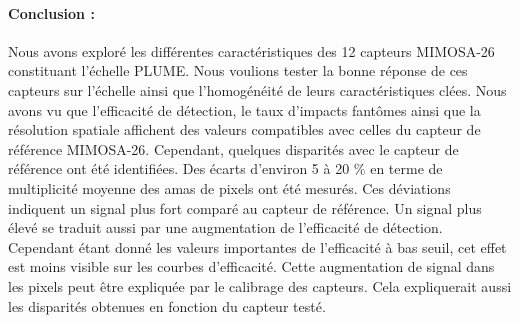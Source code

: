 %     
% 
   
  
  \paragraph{Conclusion :}
  
   Nous avons explor\'e les diff\'erentes caract\'eristiques des 12 capteurs MIMOSA-26 constituant l'\'echelle PLUME. Nous voulions tester la bonne r\'eponse de ces capteurs sur l'\'echelle ainsi que l'homog\'en\'eit\'e de leurs caract\'eristiques cl\'ees. Nous avons vu que l'efficacit\'e de d\'etection, le taux d'impacts fant\^omes ainsi que la r\'esolution spatiale affichent des valeurs compatibles avec celles du capteur de r\'ef\'erence MIMOSA-26. Cependant, quelques disparit\'es avec le capteur de r\'ef\'erence ont \'et\'e identifi\'ees. Des \'ecarts d'environ 5 \`a 20 $\%$ en terme de multiplicit\'e moyenne des amas de pixels ont \'et\'e mesur\'es. Ces d\'eviations indiquent un signal plus fort compar\'e au capteur de r\'ef\'erence. Un signal plus \'elev\'e se traduit aussi par une augmentation de l'efficacit\'e de d\'etection. Cependant \'etant donn\'e les valeurs importantes de l'efficacit\'e \`a bas seuil, cet effet est moins visible sur les courbes d'efficacit\'e. Cette augmentation de signal dans les pixels peut \^etre expliqu\'ee par le calibrage des capteurs. Cela expliquerait aussi les disparit\'es obtenues en fonction du capteur test\'e.
   
